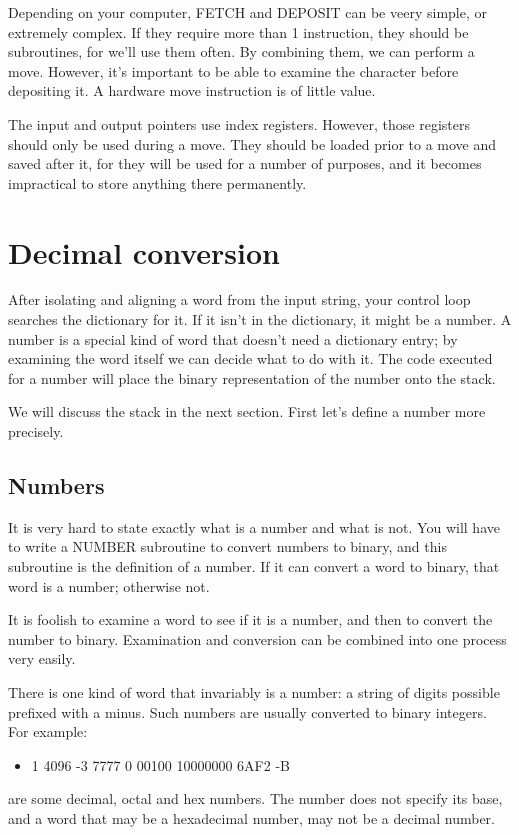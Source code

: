 \documentclass[b5paper, oneside]{book}
\begin{document}
Depending on your computer, FETCH and DEPOSIT can be veery simple, or extremely complex. If they require more than 1 instruction, they should be subroutines, for we'll use them often. By combining them, we can perform a move. However, it's important to be able to examine the character before depositing it. A hardware move instruction is of little value.

The input and output pointers use index registers. However, those registers should only be used during a move. They should be loaded prior to a move and saved after it, for they will be used for a number of purposes, and it becomes impractical to store anything there permanently.

\section{Decimal conversion}
After isolating and aligning a word from the input string, your control loop searches the dictionary for it. If it isn't in the dictionary, it might be a number. A number is a special kind of word that doesn't need a dictionary entry; by examining the word itself we can decide what to do with it. The code executed for a number will place the binary representation of the number onto the stack.

We will discuss the stack in the next section. First let's define a number more precisely.

\subsection{Numbers}
It is very hard to state exactly what is a number and what is not. You will have to write a NUMBER subroutine to convert numbers to binary, and this subroutine is the definition of a number. If it can convert a word to binary, that word is a number; otherwise not.

It is foolish to examine a word to see if it is a number, and then to convert the number to binary. Examination and conversion can be combined into one process very easily.

There is one kind of word that invariably is a number: a string of digits possible prefixed with a minus. Such numbers are usually converted to binary integers. For example:\begin{itemize}
   \item 1 4096 -3 7777 0 00100 10000000 6AF2 -B\end{itemize}
are some decimal, octal and hex numbers. The number does not specify its base, and a word that may be a hexadecimal number, may not be a decimal number.
\end{document}
